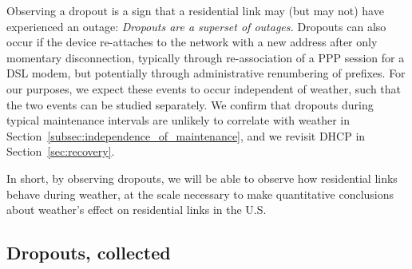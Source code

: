 
Observing a dropout is a sign that a residential link may (but may not) have
experienced an outage:
%
\emph{Dropouts are a superset of outages.}
%
Dropouts can also occur if the device re-attaches to the
network with a new address after only momentary
disconnection, typically through re-association of a PPP
session for a DSL modem, but potentially through
administrative renumbering of prefixes. For our purposes, we
expect these events to occur independent of weather, such
that the two events can be studied separately.
%
%
%
%
We confirm that dropouts during typical maintenance intervals are
unlikely to correlate with weather in
Section~\ref{subsec:independence_of_maintenance}, and we
revisit DHCP in Section~\ref{sec:recovery}.

%

In short, by observing dropouts, we will be able to observe how residential
links behave during weather, at the scale necessary to make quantitative
conclusions about weather's effect on residential links in the U.S.
%


\subsection{Dropouts, collected}

